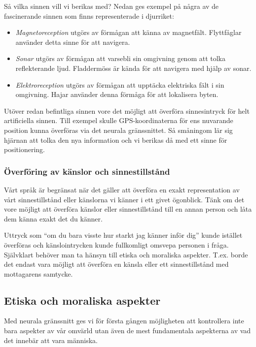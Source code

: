 \documentclass[12pt, a4paper]{article}
\begin{document}
Så vilka sinnen vill vi berikas med? Nedan ges exempel på några av de
fascinerande sinnen som finns representerade i djurriket:

\begin{itemize}
	\item \textit{Magnetoreception} utgörs av förmågan att känna av magnetfält.
	Flyttfåglar använder detta sinne för att navigera.
	\item \textit{Sonar} utgörs av förmågan att varsebli sin omgivning genom att
	tolka reflekterande ljud. Fladdermöss är kända för att navigera med hjälp av
	sonar.
	\item \textit{Elektroreception} utgörs av förmågan att upptäcka elektriska
	fält i sin omgivning. Hajar använder denna förmåga för att lokalisera byten.
\end{itemize}

Utöver redan befintliga sinnen vore det möjligt att överföra sinnesintryck för
helt artificiella sinnen. Till exempel skulle GPS-koordinaterna för ens
nuvarande position kunna överföras via det neurala gränssnittet. Så småningom
lär sig hjärnan att tolka den nya information och vi berikas då med ett sinne
för positionering.

\subsubsection{Överföring av känslor och sinnestillstånd}

Vårt språk är begränsat när det gäller att överföra en exakt representation av
vårt sinnestillstånd eller känslorna vi känner i ett givet ögonblick. Tänk om
det vore möjligt att överföra känslor eller sinnestillstånd till en annan person
och låta dem känna exakt det du känner.

Uttryck som ``om du bara visste hur starkt jag känner inför dig'' kunde istället
överföras och känslointrycken kunde fullkomligt omsvepa personen i fråga.
Självklart behöver man ta hänsyn till etiska och moraliska aspekter. T.ex. borde
det endast vara möjligt att överföra en känsla eller ett sinnestillstånd med
mottagarens samtycke.


\subsection{Etiska och moraliska aspekter}

Med neurala gränssnitt ges vi för första gången möjligheten att kontrollera inte
bara aspekter av vår omvärld utan även de mest fundamentala aspekterna av vad
det innebär att vara människa.
\end{document}
